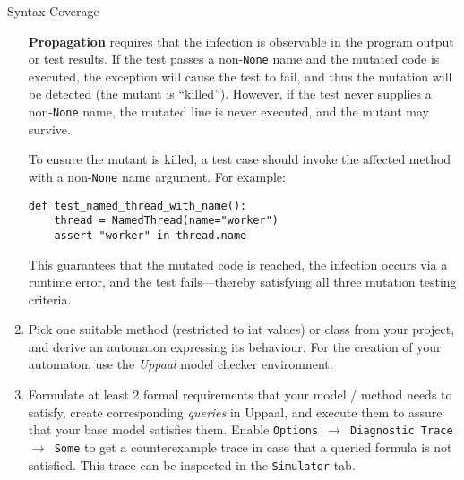 \documentclass[a4paper]{scrreprt}
\newcounter{question}
\begin{document}
\begin{question}{Syntax Coverage}
\begin{enumerate}[topsep=0pt, leftmargin=*]
\begin{answer}
\textbf{Propagation} requires that the infection is observable in the program output or test results. If the test passes a non-\texttt{None} name and the mutated code is executed, the exception will cause the test to fail, and thus the mutation will be detected (the mutant is ``killed''). However, if the test never supplies a non-\texttt{None} name, the mutated line is never executed, and the mutant may survive.

To ensure the mutant is killed, a test case should invoke the affected method with a non-\texttt{None} name argument. For example:

\begin{verbatim}
def test_named_thread_with_name():
    thread = NamedThread(name="worker")
    assert "worker" in thread.name
\end{verbatim}

This guarantees that the mutated code is reached, the infection occurs via a runtime error, and the test fails—thereby satisfying all three mutation testing criteria.





          \end{answer}

    \item Pick one suitable method (restricted to int values) or class from your project, and derive an automaton expressing its behaviour. For the creation of your automaton, use the \textit{Uppaal} model checker environment.
          \begin{answer}
            [Group: Your answer]
          \end{answer}

    \item Formulate at least 2 formal requirements that your model / method needs to satisfy, create corresponding \textit{queries} in Uppaal, and execute them to assure that your base model satisfies them. Enable \texttt{Options $\rightarrow$ Diagnostic Trace $\rightarrow$ Some} to get a counterexample trace in case that a queried formula is not satisfied. This trace can be inspected in the \texttt{Simulator} tab.
          \begin{answer}
          \end{answer}


\end{enumerate}
\end{question}
\end{document}
